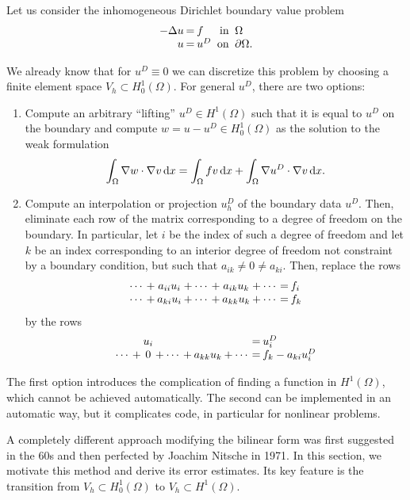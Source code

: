
\begin{intro}
Let us consider the inhomogeneous Dirichlet boundary value problem
\begin{gather}
  \label{eq:nitsche:1}
    \arraycolsep1pt
  \begin{array}{rclrl}
    -\Delta u &=& f
    &\text{ in }&\Omega\\
    u &=& u^D &\text{ on }&\partial\Omega.
  \end{array}
\end{gather}

We already know that for $u^D\equiv 0$ we can discretize this problem
by choosing a finite element space $V_h \subset H^1_0(\Omega)$. For
general $u^D$, there are two options:
\begin{enumerate}
\item Compute an arbitrary ``lifting'' $u^D\in H^1(\Omega)$ such that
  it is equal to $u^D$ on the boundary and compute
  $w=u-u^D \in H^1_0(\Omega)$ as the solution to the weak formulation
  \begin{gather}
    \label{eq:nitsche:1a}
    \int_\Omega \nabla w\cdot\nabla v\,\mathrm{d} x
    = \int_\Omega f v\,\mathrm{d} x
    + \int_\Omega \nabla u^D\cdot\nabla v\,\mathrm{d} x.
  \end{gather}
\item Compute an interpolation or projection $u^D_h$ of the boundary
  data $u^D$. Then, eliminate each row of the matrix corresponding to
  a degree of freedom on the boundary. In particular, let $i$ be the
  index of such a degree of freedom and let $k$ be an index
  corresponding to an interior degree of freedom not constraint by a
  boundary condition, but such that $a_{ik}\neq 0 \neq a_{ki}$. Then,
  replace the rows
  \begin{gather}
    \arraycolsep1pt
    \begin{array}{ccccccccccl}
      \cdots &+& a_{ii} u_i &+& \cdots &+& a_{ik} u_k &+& \cdots &=& f_i \\
      \cdots &+& a_{ki} u_i &+& \cdots &+& a_{kk} u_k &+& \cdots &=& f_k
    \end{array}
  \end{gather}
  by the rows
  \begin{gather}
    \arraycolsep1pt
    \begin{array}{ccccccccccl}
      && u_i &&  && &&  &=& u^D_i \\
      \cdots &+& 0 &+& \cdots &+& a_{kk} u_k &+& \cdots &=& f_k - a_{ki} u^D_i
    \end{array}
  \end{gather}
\end{enumerate}

The first option introduces the complication of finding a function in
$H^1(\Omega)$, which cannot be achieved automatically. The second can
be implemented in an automatic way, but it complicates code, in
particular for nonlinear problems.

A completely different approach modifying the bilinear form was first
suggested in the 60s and then perfected by Joachim Nitsche in 1971. In
this section, we motivate this method and derive its error
estimates. Its key feature is the transition from
$V_h \subset H^1_0(\Omega)$ to $V_h \subset H^1(\Omega)$.
\end{intro}

